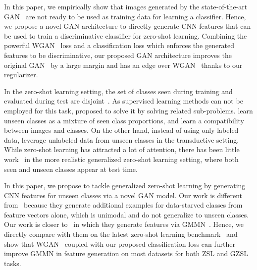 \documentclass[10pt,twocolumn,letterpaper]{article}
\newcommand{\myparagraph}[1]{\vspace{6pt}\noindent{\bf #1}}
\begin{document}
In this paper, we empirically show that images generated by the state-of-the-art GAN~\cite{gulrajani2017improved} are not ready to be used as training data for learning a classifier. Hence, we propose a novel GAN architecture to directly generate CNN features that can be used to train a discriminative classifier for zero-shot learning. Combining the powerful WGAN~\cite{gulrajani2017improved} loss and a classification loss which enforces the generated features to be discriminative, our proposed GAN architecture improves the original GAN~\cite{GPMXWDOCB14} by a large margin and has an edge over WGAN~\cite{gulrajani2017improved} thanks to our regularizer. 


\myparagraph{ZSL and GZSL.} In the zero-shot learning setting,
the set of classes seen during training and evaluated during test are disjoint~\cite{HEEY15,LNH13,LEB08,RSS11,YA10}.
As supervised learning methods can not be employed for this task, \cite{LNH13,RSS11}
proposed to solve it by solving related sub-problems. \cite{ZV15,NMBSSFCD14,CCGS16}
learn unseen classes as a mixture of seen class proportions, and \cite{APHS15,ARWLS15,FCSBDRM13,SGMN13,XASNHS16,RT15,FS16,QLSH16,AMFS16,BHJ16,FXKG15,KXFG15} learn a compatibility between images and classes. On the other hand, instead of using only labeled data, \cite{FHXFG15, MES13, LGS15} leverage  unlabeled data from unseen classes in the transductive setting. While zero-shot learning has attracted a lot of attention, there has been little work~\cite{SGMN13,CCGS16b} in the more realistic generalized zero-shot learning setting, where both seen and unseen classes appear at test time. 


In this paper, we propose to tackle generalized zero-shot learning by generating CNN features for unseen classes via a novel GAN model. Our work is different from~\cite{HG16} because they generate additional examples for data-starved classes from feature vectors alone, which is unimodal and do not generalize to unseen classes. Our work is closer to~\cite{BHJ17} in which they generate features via GMMN~\cite{li2015generative}. Hence, we directly compare with them on the latest zero-shot learning benchmark~\cite{XSA17} and show that WGAN~\cite{arjovsky2017wasserstein} coupled with our proposed classification loss can further improve GMMN in feature generation on most datasets for both ZSL and GZSL tasks.
\end{document}
